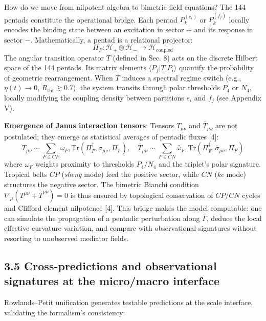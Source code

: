 \documentclass[11pt]{article}
\let\oldmathcal\mathcal
\renewcommand{\mathcal}[1]{\oldmathcal{#1}}
\begin{document}
How do we move from nilpotent algebra to bimetric field equations? The
144 pentads constitute the operational bridge. Each pentad
\(P_k^{(e_i)}\) or \(P_k^{(f_j)}\) locally encodes the binding state
between an excitation in sector \(+\) and its response in sector \(-\).
Mathematically, a pentad is a relational projector: \[
\Pi_{P} : \mathcal{H}_{+} \otimes \mathcal{H}_{-} \to \mathcal{H}_{\text{coupled}}
\] The angular transition operator \(T\) (defined in Sec. 8) acts on the
discrete Hilbert space of the 144 pentads. Its matrix elements
\(\langle P_f | T | P_i \rangle\) quantify the probability of geometric
rearrangement. When \(T\) induces a spectral regime switch (e.g.,
\(\eta(t) \to 0\), \(R_{\text{thr}} \gtrsim 0.7\)), the system transits
through polar thresholds \(P_4\) or \(N_4\), locally modifying the
coupling density between partitions \(e_i\) and \(f_j\) (see Appendix
V).

\textbf{Emergence of Janus interaction tensors}: Tensors \(T_{\mu\nu}\)
and \(\bar{T}_{\mu\nu}\) are not postulated; they emerge as statistical
averages of pentadic fluxes {[}4{]}: \[
T_{\mu\nu} \sim \sum_{F \in CP} \omega_F , \text{Tr}\left( \Pi_F^\dagger , \sigma_{\mu\nu} , \Pi_F \right), \quad
\bar{T}_{\mu\nu} \sim \sum_{F \in CN} \bar{\omega}_F , \text{Tr}\left( \Pi_F^\dagger , \bar{\sigma}_{\mu\nu} , \Pi_F \right)
\] where \(\omega_F\) weights proximity to thresholds \(P_4/N_4\) and
the triplet's polar signature. Tropical belts \(CP\) (\textit{sheng}
mode) feed the positive sector, while \(CN\) (\textit{ke} mode)
structures the negative sector. The bimetric Bianchi condition
\(\nabla_\mu(T^{\mu\nu}+\bar{T}^{\mu\nu})=0\) is thus ensured by
topological conservation of \(CP/CN\) cycles and Clifford element
nilpotence {[}4{]}. This bridge makes the model computable: one can
simulate the propagation of a pentadic perturbation along \(\Gamma\),
deduce the local effective curvature variation, and compare with
observational signatures without resorting to unobserved mediator
fields.

\hypertarget{cross-predictions-and-observational-signatures-at-the-micromacro-interface}{%
\subsection{3.5 Cross-predictions and observational signatures at the
micro/macro
interface}\label{cross-predictions-and-observational-signatures-at-the-micromacro-interface}}

Rowlands--Petit unification generates testable predictions at the scale
interface, validating the formalism's consistency:
\end{document}
